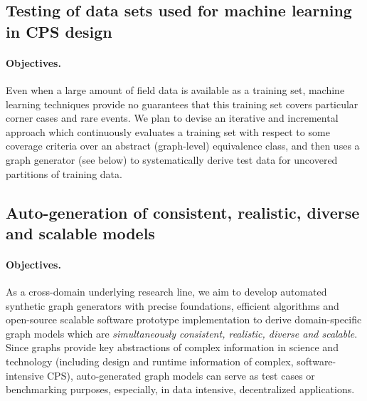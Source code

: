\subsection{Testing of data sets used for machine learning in CPS design}

\paragraph{Objectives.} Even when a large amount of field data is available as a training set, machine learning techniques provide no guarantees that this training set covers particular corner cases and rare events. We plan to devise an iterative and incremental approach which continuously evaluates a training set with respect to some coverage criteria over an abstract (graph-level) equivalence class, and then uses a graph generator (see below) to systematically derive test data for uncovered partitions of training data.

\subsection{Auto-generation of consistent, realistic, diverse and scalable models}
\paragraph{Objectives.} As a cross-domain underlying research line, we aim to develop automated synthetic graph generators with precise foundations, efficient algorithms and open-source scalable software prototype implementation to derive domain-specific graph models which are \emph{simultaneously consistent, realistic, diverse and scalable}. 
Since graphs provide key abstractions of complex information in science and technology (including  design and runtime information of complex, software-intensive CPS), auto-generated graph models can serve as test cases or benchmarking purposes, especially, in data intensive, decentralized applications.
